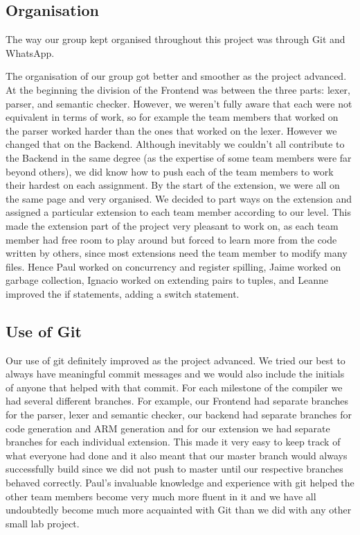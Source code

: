 \documentclass{article}
\begin{document}
\subsection{Organisation}
The way our group kept organised throughout this project was through Git and WhatsApp. 

The organisation of our group got better and smoother as the project advanced. At the beginning the division of the Frontend was between the three parts: lexer, 
parser, and semantic checker. However, we weren't fully aware that each were not equivalent in terms of work, so for example the team members that worked on the parser worked harder than the ones that worked on the lexer. However we changed that on the Backend. Although inevitably we couldn't all contribute to the Backend in the same degree (as the expertise of some team members were far beyond others), we did know how to push each of the team members to work their hardest on each assignment. By the start of the extension, we were all on the same page and very organised. We decided to part ways on the extension and assigned a particular extension to each team member according to our level. This made the extension part of the project very pleasant to work on, as each team member had 
free room to play around but forced to learn more from the code written by others, since most extensions need the team member to modify many files. Hence Paul worked on concurrency and register spilling, Jaime worked on garbage collection, Ignacio worked on extending pairs to tuples, and Leanne improved the if statements, adding a switch statement. 

\subsection{Use of Git}
Our use of git definitely improved as the project advanced. We tried our best to always have meaningful commit messages and we would also include the initials of anyone that helped with that commit. For each milestone of the compiler we had several different branches. For example, our Frontend had separate branches for the parser, lexer and semantic checker, our backend had separate branches for code generation and ARM generation and for our extension we had separate branches for each individual extension. This made it very easy to keep track of what everyone had done and it also meant that our master branch would always successfully build since we did not push to master until our respective branches behaved correctly. Paul's invaluable knowledge and experience with git helped the other team members become very much more fluent in it and we have all undoubtedly become much more acquainted with Git than we did with any other small lab project.
\end{document}
